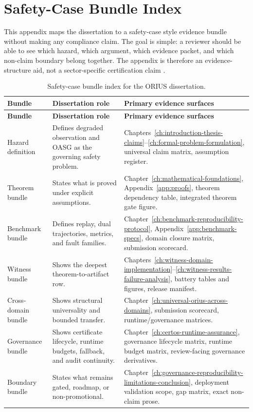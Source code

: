 \chapter{Safety-Case Bundle Index}
\label{app:safety-case-bundle-index}

This appendix maps the dissertation to a safety-case style evidence bundle without making
any compliance claim. The goal is simple: a reviewer should be able to see which hazard,
which argument, which evidence packet, and which non-claim boundary belong together. The
appendix is therefore an evidence-structure aid, not a sector-specific certification claim
\cite{ul4600_2023,nist2023ai_rmf,iso26262_2018,iec61508_2010}.

\begin{longtable}{p{}p{}p{}} 
\caption{Safety-case bundle index for the ORIUS dissertation.}\label{tab:safety-case-bundle-index}\\
\toprule
\textbf{Bundle} & \textbf{Dissertation role} & \textbf{Primary evidence surfaces}\\
\midrule
\endfirsthead
\toprule
\textbf{Bundle} & \textbf{Dissertation role} & \textbf{Primary evidence surfaces}\\
\midrule
\endhead
Hazard definition & Defines degraded observation and OASG as the governing safety problem. & Chapters~\ref{ch:introduction-thesis-claims}--\ref{ch:formal-problem-formulation}, universal claim matrix, assumption register.\\
Theorem bundle & States what is proved under explicit assumptions. & Chapter~\ref{ch:mathematical-foundations}, Appendix~\ref{app:proofs}, theorem dependency table, integrated theorem gate figure.\\
Benchmark bundle & Defines replay, dual trajectories, metrics, and fault families. & Chapter~\ref{ch:benchmark-reproducibility-protocol}, Appendix~\ref{app:benchmark-specs}, domain closure matrix, submission scorecard.\\
Witness bundle & Shows the deepest theorem-to-artifact row. & Chapters~\ref{ch:witness-domain-implementation}--\ref{ch:witness-results-failure-analysis}, battery tables and figures, release manifest.\\
Cross-domain bundle & Shows structural universality and bounded transfer. & Chapter~\ref{ch:universal-orius-across-domains}, submission scorecard, runtime/governance matrices.\\
Governance bundle & Shows certificate lifecycle, runtime budgets, fallback, and audit continuity. & Chapter~\ref{ch:certos-runtime-assurance}, governance lifecycle matrix, runtime budget matrix, review-facing governance derivatives.\\
Boundary bundle & States what remains gated, roadmap, or non-promotional. & Chapter~\ref{ch:governance-reproducibility-limitations-conclusion}, deployment validation scope, gap matrix, exact non-claim prose.\\
\bottomrule
\end{longtable}

